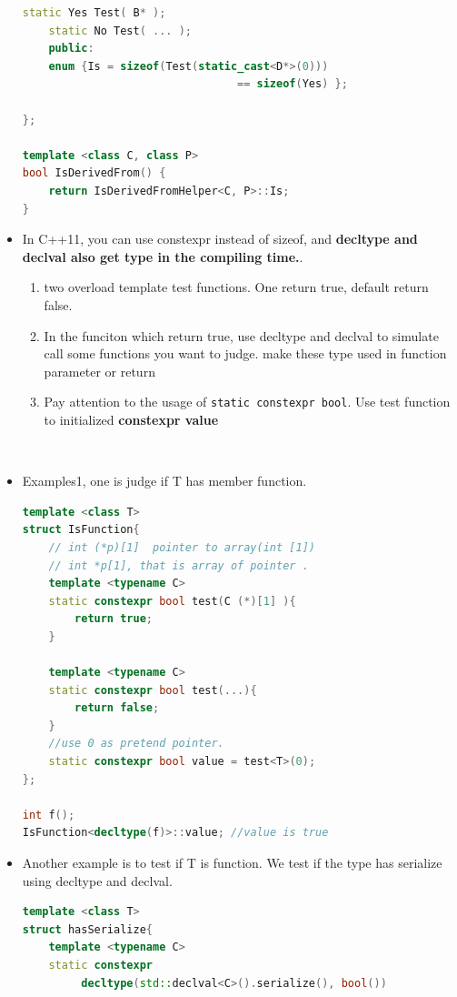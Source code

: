 \documentclass[a4paper,11pt,twoside]{book}
\begin{document}
\begin{itemize}
\begin{lstlisting}[frame=single, language=c++]
	static Yes Test( B* );
	static No Test( ... );
	public:
	enum {Is = sizeof(Test(static_cast<D*>(0)))
	                             == sizeof(Yes) };
	
};
	
template <class C, class P> 
bool IsDerivedFrom() {
	return IsDerivedFromHelper<C, P>::Is;
}
\end{lstlisting}
	
	\item In C++11, you can use constexpr instead of sizeof, and \textbf{decltype and declval also get type in the compiling time.}. 
	\begin{enumerate}
		\item two overload template test functions. One return true, default return false.
		
		\item In the funciton which return true, use decltype and declval to simulate call some functions you want to judge. make these type used in function parameter or return 
		
		\item Pay attention to the usage of \texttt{static constexpr bool}. Use test function to initialized \textbf{constexpr value} 
		
	\end{enumerate}
\
\item Examples1, one is judge if T has member function.

\begin{lstlisting}[frame=single, language=c++]
template <class T>
struct IsFunction{
	// int (*p)[1]  pointer to array(int [1])
	// int *p[1], that is array of pointer .
	template <typename C> 
	static constexpr bool test(C (*)[1] ){
		return true;
	}
	
	template <typename C> 
	static constexpr bool test(...){
		return false;
	}
	//use 0 as pretend pointer.
	static constexpr bool value = test<T>(0);
};

int f();
IsFunction<decltype(f)>::value; //value is true 
\end{lstlisting}


\item  Another example is to test if T is function. We test if the type has serialize using decltype and declval.

\begin{lstlisting}[frame=single, language=c++]
template <class T> 
struct hasSerialize{
	template <typename C>
	static constexpr 
	     decltype(std::declval<C>().serialize(), bool())
	     

\end{lstlisting}
\end{itemize}
\end{document}

